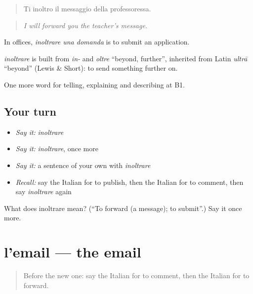 \begin{quote}
Ti inoltro il messaggio della professoressa.
\end{quote}

\begin{quote}
\emph{I will forward you the teacher's message.}
\end{quote}

In offices, \emph{inoltrare una domanda} is to submit an application.

\begin{cousinweb}
\emph{inoltrare} is built from \emph{in-} and \emph{oltre} \textquotedblleft{}beyond, further\textquotedblright{}, inherited from Latin \emph{ultrā} \textquotedblleft{}beyond\textquotedblright{} (Lewis \& Short): to send something further on.
\end{cousinweb}

\begin{grammarlens}[title={What you've built}]
One more word for telling, explaining and describing at B1.
\end{grammarlens}

\subsection*{Your turn}
\begin{itemize}
\raggedright
  \item \emph{Say it:} \emph{inoltrare}
  \item \emph{Say it:} \emph{inoltrare}, once more
  \item \emph{Say it:} a sentence of your own with \emph{inoltrare}
  \item \emph{Recall:} say the Italian for to publish, then the Italian for to comment, then say \emph{inoltrare} again
\end{itemize}

\begin{tcolorbox}[breakable,colback=teal!4,colframe=teal!35!black,title={Before you move on}]
What does inoltrare mean? (\textquotedblleft{}To forward (a message); to submit\textquotedblright{}.) Say it once more.
\end{tcolorbox}
\section[l'email]{l'email — the email}

\label{lesson:IT-C403-email}



\begin{quote}
Before the new one: say the Italian for to comment, then the Italian for to forward.
\end{quote}

